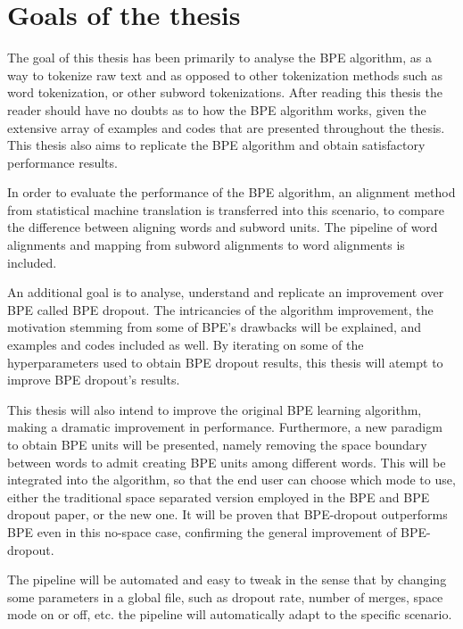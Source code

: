 %
%

\chapter{Goals of the thesis}

The goal of this thesis has been primarily to analyse the BPE algorithm, as a way to tokenize raw text and as opposed to other tokenization methods such as word tokenization, or other subword tokenizations. After reading this thesis the reader should have no doubts as to how the BPE algorithm works, given the extensive array of examples and codes that are presented throughout the thesis. This thesis also aims to replicate the BPE algorithm and obtain satisfactory performance results.

In order to evaluate the performance of the BPE algorithm, an alignment method from statistical machine translation is transferred into this scenario, to compare the difference between aligning words and subword units. The pipeline of word alignments and mapping from subword alignments to word alignments is included.

An additional goal is to analyse, understand and replicate an improvement over BPE called BPE dropout. The intricancies of the algorithm improvement, the motivation stemming from some of BPE's drawbacks will be explained, and examples and codes included as well. By iterating on some of the hyperparameters used to obtain BPE dropout results, this thesis will atempt to improve BPE dropout's results.

This thesis will also intend to improve the original BPE learning algorithm, making a dramatic improvement in performance. Furthermore, a new paradigm to obtain BPE units will be presented, namely removing the space boundary between words to admit creating BPE units among different words. This will be integrated into the algorithm, so that the end user can choose which mode to use, either the traditional space separated version employed in the BPE and BPE dropout paper, or the new one. It will be proven that BPE-dropout outperforms BPE even in this no-space case, confirming the general improvement of BPE-dropout.

The pipeline will be automated and easy to tweak in the sense that by changing some parameters in a global file, such as dropout rate, number of merges, space mode on or off, etc. the pipeline will automatically adapt to the specific scenario.
